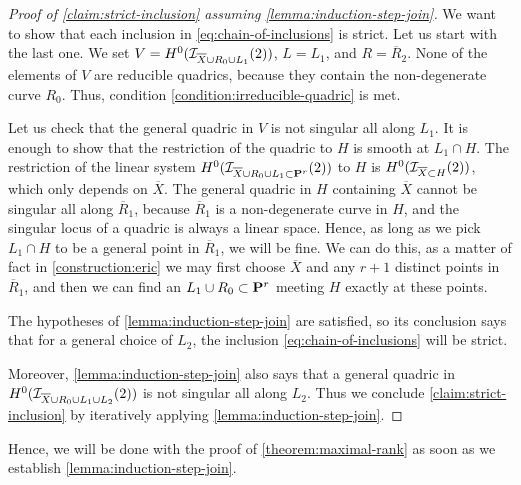 \documentclass[11pt, two side, letterpaper, final]{amsart}
\renewcommand{\P}{{\bf P}}
\begin{document}
\begin{proof}[Proof of \cref{claim:strict-inclusion} assuming \cref{lemma:induction-step-join}]
We want to show that each inclusion in \eqref{eq:chain-of-inclusions} is strict.
Let us start with the last one. We set $V= H^0({\mathcal I}_{\overline{X}\cup R_0 \cup L_1}(2))$, $L=L_1$, and
$R=\overline{R}_2$. None of the elements of $V$ are reducible quadrics, because they contain the non-degenerate curve $R_0$. Thus, condition \ref{condition:irreducible-quadric} is met.

Let us check that the general quadric in $V$ is not singular all along
$L_1$. It is enough to show that the restriction
of the quadric to $H$ is smooth at $L_1 \cap H$. The restriction of the linear system
$H^0(\sh{I}_{\overline{X}\cup R_0 \cup L_1 \subset \P^r}(2))$ to $H$ is 
$H^0({\mathcal I}_{\overline{X} \subset H}(2))$, which only depends on $\overline{X}$. The general quadric in $H$ containing $\overline{X}$ cannot be singular all along $\overline{R}_1$, because
$\overline{R}_1$ is a non-degenerate curve in $H$, and the singular locus of a quadric is always a linear space. Hence, as long as we pick $L_1 \cap H$ to be a general point in $\overline{R}_1$, we will be fine. We can do this, as a matter of fact in \cref{construction:eric} we may first choose $\overline{X}$ and any $r+1$ distinct points in $\overline{R}_1$, and then we can find an $L_1 \cup R_0 \subset \P^r$
meeting $H$ exactly at these points.

The hypotheses of \cref{lemma:induction-step-join} are satisfied, so its conclusion says that
for a general choice of $L_2$, the inclusion \eqref{eq:chain-of-inclusions} will be strict.

Moreover, \cref{lemma:induction-step-join} also says that a general quadric in  
$H^0({\mathcal I}_{\overline{X}\cup R_0 \cup L_1 \cup L_2}(2))$ is not singular all along $L_2$. Thus we conclude \cref{claim:strict-inclusion} by iteratively applying \cref{lemma:induction-step-join}.

\end{proof}

Hence, we will be done with the proof of \cref{theorem:maximal-rank} as soon as 
we establish \cref{lemma:induction-step-join}.
\end{document}
